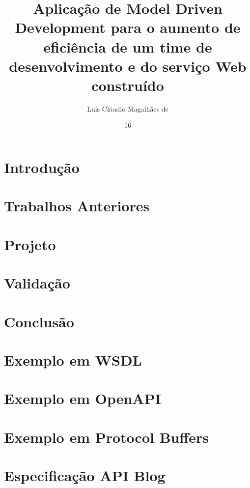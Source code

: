 \documentclass[tg]{ita}    %
\author{Luis Cláudio Magalhães de}{Holanda}
\title{Aplicação de Model Driven Development para o aumento de eficiência de um time de desenvolvimento e do serviço Web construído}
\date{16}{novembro}{2021}
\begin{document}


\mainmatter

\chapter{Introdução}\label{cap:introduction}


\chapter{Trabalhos Anteriores}\label{cap:past-works}


\chapter{Projeto}\label{cap:project}



\chapter{Validação}\label{cap:validation}


\chapter{Conclusão}\label{cap:conclusion}



\renewcommand\bibname{\itareferencesnamebabel} %


\annex
\chapter{Exemplo em WSDL}\label{anex:wsdl-example}


\chapter{Exemplo em OpenAPI}\label{anex:openapi-example}


\chapter{Exemplo em Protocol Buffers}\label{anex:protobuf-example}


\chapter{Especificação API Blog}\label{anex:blog-spec}

\end{document}
